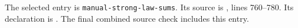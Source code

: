 The selected entry is \texttt{manual-strong-law-sums}. Its source is , lines 760--780. Its declaration is . The final combined source check includes this entry.
